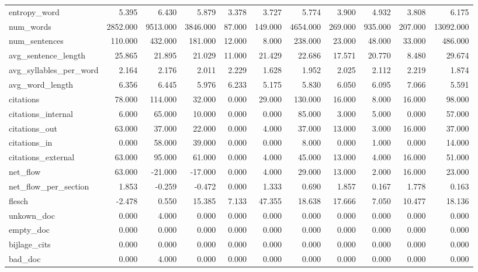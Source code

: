 \begin{tabular}{lrrrrrrrrrr}
\cline{1-11}
entropy\_word & 5.395 & 6.430 & 5.879 & 3.378 & 3.727 & 5.774 & 3.900 & 4.932 & 3.808 & 6.175 \\
\cline{1-11}
num\_words & 2852.000 & 9513.000 & 3846.000 & 87.000 & 149.000 & 4654.000 & 269.000 & 935.000 & 207.000 & 13092.000 \\
\cline{1-11}
num\_sentences & 110.000 & 432.000 & 181.000 & 12.000 & 8.000 & 238.000 & 23.000 & 48.000 & 33.000 & 486.000 \\
\cline{1-11}
avg\_sentence\_length & 25.865 & 21.895 & 21.029 & 11.000 & 21.429 & 22.686 & 17.571 & 20.770 & 8.480 & 29.674 \\
\cline{1-11}
avg\_syllables\_per\_word & 2.164 & 2.176 & 2.011 & 2.229 & 1.628 & 1.952 & 2.025 & 2.112 & 2.219 & 1.874 \\
\cline{1-11}
avg\_word\_length & 6.356 & 6.445 & 5.976 & 6.233 & 5.175 & 5.830 & 6.050 & 6.095 & 7.066 & 5.591 \\
\cline{1-11}
citations & 78.000 & 114.000 & 32.000 & 0.000 & 29.000 & 130.000 & 16.000 & 8.000 & 16.000 & 98.000 \\
\cline{1-11}
citations\_internal & 6.000 & 65.000 & 10.000 & 0.000 & 0.000 & 85.000 & 3.000 & 5.000 & 0.000 & 57.000 \\
\cline{1-11}
citations\_out & 63.000 & 37.000 & 22.000 & 0.000 & 4.000 & 37.000 & 13.000 & 3.000 & 16.000 & 37.000 \\
\cline{1-11}
citations\_in & 0.000 & 58.000 & 39.000 & 0.000 & 0.000 & 8.000 & 0.000 & 1.000 & 0.000 & 14.000 \\
\cline{1-11}
citations\_external & 63.000 & 95.000 & 61.000 & 0.000 & 4.000 & 45.000 & 13.000 & 4.000 & 16.000 & 51.000 \\
\cline{1-11}
net\_flow & 63.000 & -21.000 & -17.000 & 0.000 & 4.000 & 29.000 & 13.000 & 2.000 & 16.000 & 23.000 \\
\cline{1-11}
net\_flow\_per\_section & 1.853 & -0.259 & -0.472 & 0.000 & 1.333 & 0.690 & 1.857 & 0.167 & 1.778 & 0.163 \\
\cline{1-11}
flesch & -2.478 & 0.550 & 15.385 & 7.133 & 47.355 & 18.638 & 17.666 & 7.050 & 10.477 & 18.136 \\
\cline{1-11}
unkown\_doc & 0.000 & 4.000 & 0.000 & 0.000 & 0.000 & 0.000 & 0.000 & 0.000 & 0.000 & 0.000 \\
\cline{1-11}
empty\_doc & 0.000 & 0.000 & 0.000 & 0.000 & 0.000 & 0.000 & 0.000 & 0.000 & 0.000 & 0.000 \\
\cline{1-11}
bijlage\_cits & 0.000 & 0.000 & 0.000 & 0.000 & 0.000 & 0.000 & 0.000 & 0.000 & 0.000 & 0.000 \\
\cline{1-11}
bad\_doc & 0.000 & 4.000 & 0.000 & 0.000 & 0.000 & 0.000 & 0.000 & 0.000 & 0.000 & 0.000 \\
\cline{1-11}
\bottomrule
\end{tabular}
